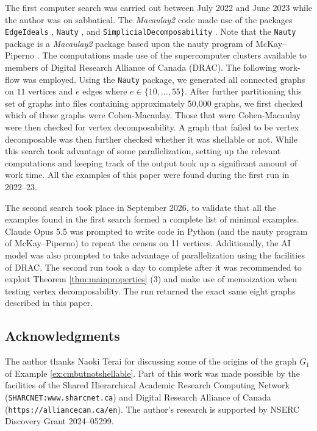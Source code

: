 \documentclass[12pt]{amsart}
\theoremstyle{plain}
\theoremstyle{definition}
\theoremstyle{remark}
\numberwithin{equation}{section}
\numberwithin{equation}{section}
\begin{document}
The first computer search was carried out between July 2022 and June 2023 while
the author was on sabbatical.  The {\it Macaulay2} code 
made use of the packages
{\tt EdgeIdeals} \cite{edge}, {\tt Nauty} \cite{nauty}, and
{\tt SimplicialDecomposability} \cite{simpdecomp}.   Note that the 
{\tt Nauty} package is a {\it Macaulay2} package  based upon the
nauty program of McKay--Piperno \cite{MP2013}.   The 
computations made use of the supercomputer clusters available to 
members of Digital Research Alliance of Canada (DRAC).
The following work-flow was employed.  Using the {\tt Nauty} package, 
we generated all connected graphs on 
$11$ vertices and $e$ edges where $e \in \{10,\ldots,55\}$.  After
further partitioning this set of graphs into files containing approximately
50,000 graphs, we first
checked which of these graphs were Cohen-Macaulay.  Those that 
were Cohen-Macaulay were then checked for vertex decomposability.
A graph that failed to be vertex decomposable was then further 
checked whether it was shellable or not.  
While this search took advantage of some parallelization, setting up 
the relevant computations and keeping track of the output took up a significant
amount of work time.  All the examples of this paper were found during
the first run in 2022--23.

The second search took place in  September 2026, to validate
that all the examples found in the first search formed a  complete list 
of minimal examples.  Claude Opus 5.5 was
prompted to write code in Python (and the nauty program of McKay--Piperno)
to repeat the census on 11 vertices.  Additionally, the AI model was also prompted to take advantage of parallelization
using the facilities of  DRAC.  
The second run took a day to complete after it was recommended to exploit
Theorem \ref{thm:mainproperties} (3) and make use of memoization when
testing vertex decomposability.  The run returned the exact same eight
graphs described in this paper.

\subsection*{Acknowledgments}
The author thanks Naoki Terai for discussing some of 
the origins of the graph $G_1$ of Example \ref{ex:cmbutnotshellable}. 
Part of this work was made possible by the 
facilities of the Shared Hierarchical Academic 
Research Computing Network 
({\tt SHARCNET:www.sharcnet.ca}) and 
Digital Research Alliance of Canada 
({\tt https://alliancecan.ca/en}).
The author's research is supported by NSERC Discovery Grant 2024--05299. 
\end{document}

